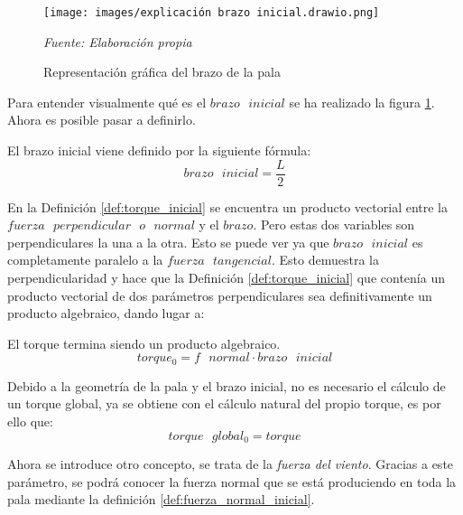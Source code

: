      \textbf{}
    \begin{figure}[H]
    \centering
    \texttt{[image: images/explicación brazo inicial.drawio.png]}
    \caption{Representación gráfica del brazo de la pala}
    \label{fig:exp_brazo_inicial}
    \textit{Fuente: Elaboración propia}
\end{figure}
 

Para entender visualmente qué es el $brazo \text{ } inicial$ se ha realizado la figura \ref{fig:exp_brazo_inicial}. Ahora es posible pasar a definirlo.


\begin{definicion}
El  brazo inicial viene definido por la siguiente fórmula:
$$ brazo \text{ } inicial = \dfrac{L}{2}$$
\end{definicion}
 
 En la Definición \ref{def:torque_inicial} se encuentra un producto vectorial entre la $fuerza  \text{ }perpendicular \text{ } o \text{ } normal$ y el $brazo$. Pero estas dos variables son perpendiculares la una a la otra. Esto se puede ver ya que $brazo \text{ } inicial$ es completamente paralelo a la $fuerza \text{ } tangencial$. Esto demuestra la perpendicularidad y hace que la Definición \ref{def:torque_inicial} que contenía un producto vectorial de dos parámetros perpendiculares sea definitivamente un producto algebraico, dando lugar a:
 
  \begin{definicion}
  El torque termina siendo un producto algebraico.
 $$ torque_0 = f \text{ } normal \cdot brazo \text{ } inicial$$
 \label{def:torque_algebraico_inicial}
 \end{definicion}
 
   \begin{definicion}
Debido a la geometría de la pala y el brazo inicial, no es necesario el cálculo de un torque global, ya se obtiene con el cálculo natural del propio torque, es por ello que:
 $$ torque \text{ } global_0 = torque$$
 \label{def:torque_global_inicial}
 \end{definicion}
 
 
 Ahora se introduce otro concepto, se trata de la \textit{fuerza del viento}. Gracias a este parámetro, se podrá conocer la fuerza normal que se está produciendo en toda la pala mediante la definición \ref{def:fuerza_normal_inicial}.
 
